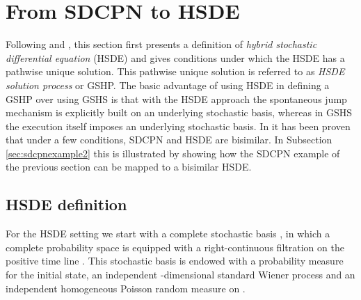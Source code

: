 \documentclass[copyright,creativecommons]{eptcs}
\begin{document}
\section{From SDCPN to HSDE}\label{sec:hsde}

Following \cite{Blom2003} and
\cite{BlomBakkerEverdijPark2003b}, this section first presents
a definition of \emph{hybrid stochastic differential equation} (HSDE) and gives conditions
under which the HSDE has a pathwise unique solution. This pathwise
unique solution is referred to as \emph{HSDE solution process} or
GSHP. The basic advantage of using HSDE in defining a GSHP over
using GSHS is that with the HSDE approach the spontaneous jump
mechanism is explicitly built on an underlying stochastic basis,
whereas in GSHS the execution itself imposes an underlying
stochastic basis.
In \cite{EverdijBlom2009} it has been proven that
under a few conditions, SDCPN and HSDE are bisimilar. In
Subsection \ref{sec:sdcpnexample2} this is illustrated
by showing how the SDCPN example of the previous section can be
mapped to a bisimilar HSDE.



\subsection{HSDE definition}

For the HSDE setting we start with a complete stochastic basis
, in which a
complete probability space  is equipped
with a right-continuous filtration  on the
positive time line . This stochastic
basis is endowed with a probability measure 
for the initial state,
an independent -dimensional standard Wiener process  and an
independent homogeneous Poisson random measure  on
.
\end{document}
